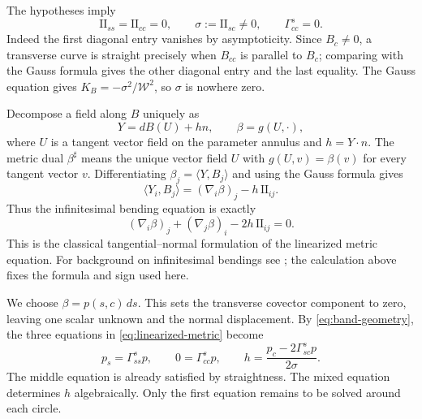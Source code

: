 \documentclass[11pt]{amsart}
\theoremstyle{definition}
\begin{document}
The hypotheses imply
\begin{equation}\label{eq:band-geometry}
 \mathrm{II}_{ss}=\mathrm{II}_{cc}=0,\qquad
 \sigma:=\mathrm{II}_{sc}\ne0,\qquad \Gamma^s_{cc}=0.
\end{equation}
Indeed the first diagonal entry vanishes by asymptoticity.
Since $B_c\ne0$, a transverse curve is straight precisely when
$B_{cc}$ is parallel to $B_c$; comparing with the Gauss formula
gives the other diagonal entry and the last equality.
The Gauss equation gives $K_B=-\sigma^2/\mathcal W^2$,
so $\sigma$ is nowhere zero.

Decompose a field along $B$ uniquely as
\[
 Y=dB(U)+hn,\qquad \beta=g(U,\cdot),
\]
where $U$ is a tangent vector field on the parameter annulus and
$h=Y\cdot n$. The metric dual $\beta^\sharp$ means the unique vector
field $U$ with $g(U,v)=\beta(v)$ for every tangent vector $v$.
Differentiating $\beta_j=\langle Y,B_j\rangle$ and using the
Gauss formula gives
\[
 \langle Y_i,B_j\rangle=(\nabla_i\beta)_j-h\,\mathrm{II}_{ij}.
\]
Thus the infinitesimal bending equation is exactly
\begin{equation}\label{eq:linearized-metric}
 (\nabla_i\beta)_j+(\nabla_j\beta)_i
                          -2h\,\mathrm{II}_{ij}=0.
\end{equation}
This is the classical tangential--normal formulation of the
linearized metric equation. For background on infinitesimal
bendings see \cite[Chapter~12]{Spivak}; the calculation above fixes
the formula and sign used here.

We choose $\beta=p(s,c)\,ds$. This sets the transverse covector
component to zero, leaving one scalar unknown and the normal
displacement. By \eqref{eq:band-geometry}, the three equations
in \eqref{eq:linearized-metric} become
\begin{equation}\label{eq:reduced-strain}
 p_s=\Gamma^s_{ss}p,\qquad
 0=\Gamma^s_{cc}p,\qquad
 h=\frac{p_c-2\Gamma^s_{sc}p}{2\sigma}.
\end{equation}
The middle equation is already satisfied by straightness.
The mixed equation determines $h$ algebraically.
Only the first equation remains to be solved around each circle.
\end{document}
